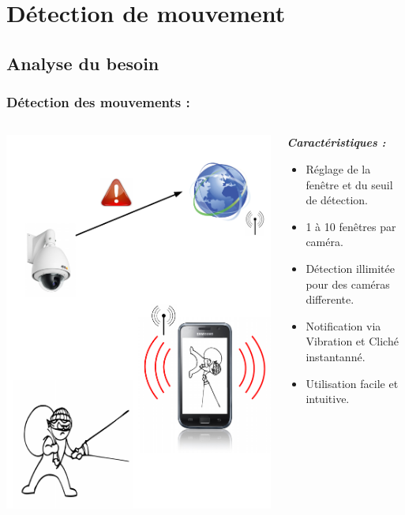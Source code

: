 
\section{Détection de mouvement}
 \subsection{Analyse du besoin}
  \begin{frame}
   \frametitle{Détection des mouvements :}



\begin{columns}
\begin{column}{5cm}

   \includegraphics[scale=0.25]{Images/ImageSlide10.pdf}
\end{column}
\begin{column}{7cm}
\textbf{\textit{Caractéristiques :}} 
\begin{itemize}
    \item Réglage de la fenêtre et du seuil de détection.
  	\item 1 à 10 fenêtres par caméra.
  	\item Détection illimitée pour des caméras differente.
 	\item Notification via Vibration et Cliché instantanné.
 	\item Utilisation facile et intuitive.
\end{itemize}
\end{column}
\end{columns}
  \end{frame}
